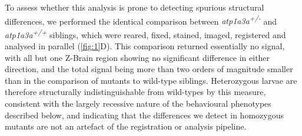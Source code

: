 \documentclass[9.5pt,lineno]{RandlettLab_elife}
\begin{document}
To assess whether this analysis is prone to detecting spurious structural differences, we performed the identical comparison between \emph{atp1a3a\textsuperscript{+/-}} and \emph{atp1a3a\textsuperscript{+/+}} siblings, which were reared, fixed, stained, imaged, registered and analysed in parallel (\autoref{fig:1}D).
This comparison returned essentially no signal, with all but one Z-Brain region showing no significant difference in either direction, and the total signal being more than two orders of magnitude smaller than in the comparison of mutants to wild-type siblings.
Heterozygous larvae are therefore structurally indistinguishable from wild-types by this measure, consistent with the largely recessive nature of the behavioural phenotypes described below, and indicating that the differences we detect in homozygous mutants are not an artefact of the registration or analysis pipeline.
\end{document}
